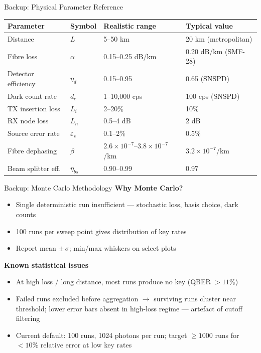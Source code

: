 \documentclass[10pt]{beamer}
\newcommand{\lighthline}{\arrayrulecolor{gray!35}\hline\arrayrulecolor{black}}
\begin{document}
\begin{frame}{Backup: Physical Parameter Reference}
    \renewcommand{\arraystretch}{1.3}
    \scriptsize
    \begin{tabular}{llll}
        \toprule
        \textbf{Parameter} & \textbf{Symbol} & \textbf{Realistic range} & \textbf{Typical value} \\
        \midrule
        Distance              & $L$             & 5--50 km              & 20 km (metropolitan) \\
        \lighthline
        Fibre loss            & $\alpha$        & 0.15--0.25 dB/km      & 0.20 dB/km (SMF-28) \\
        \lighthline
        Detector efficiency   & $\eta_d$        & 0.15--0.95            & 0.65 (SNSPD) \\
        \lighthline
        Dark count rate       & $d_c$           & 1--10{,}000 cps       & 100 cps (SNSPD) \\
        \lighthline
        TX insertion loss     & $L_i$           & 2--20\%               & 10\% \\
        \lighthline
        RX node loss          & $L_n$           & 0.5--4 dB             & 2 dB \\
        \lighthline
        Source error rate     & $\varepsilon_s$ & 0.1--2\%              & 0.5\% \\
        \lighthline
        Fibre dephasing       & $\beta$         & $2.6\times10^{-7}$--$3.8\times10^{-7}$/km & $3.2\times10^{-7}$/km \\
        \lighthline
        Beam splitter eff.    & $\eta_{bs}$     & 0.90--0.99            & 0.97 \\
        \bottomrule
    \end{tabular}
\end{frame}

\begin{frame}{Backup: Monte Carlo Methodology}
    \textbf{Why Monte Carlo?}
    \begin{itemize}\small
        \item Single deterministic run insufficient — stochastic loss, basis choice, dark counts
        \item 100 runs per sweep point gives distribution of key rates
        \item Report mean $\pm\,\sigma$; min/max whiskers on select plots
    \end{itemize}

    \vspace{0.2cm}
    \textbf{Known statistical issues}
    \begin{itemize}\small
        \item At high loss / long distance, most runs produce no key (QBER $> 11\%$)
        \item Failed runs excluded before aggregation $\to$ surviving runs cluster near threshold;
              lower error bars absent in high-loss regime — artefact of cutoff filtering
        \item Current default: 100 runs, 1024 photons per run;
              target ${\geq}1000$ runs for $<10\%$ relative error at low key rates
    \end{itemize}
\end{frame}
\end{document}
